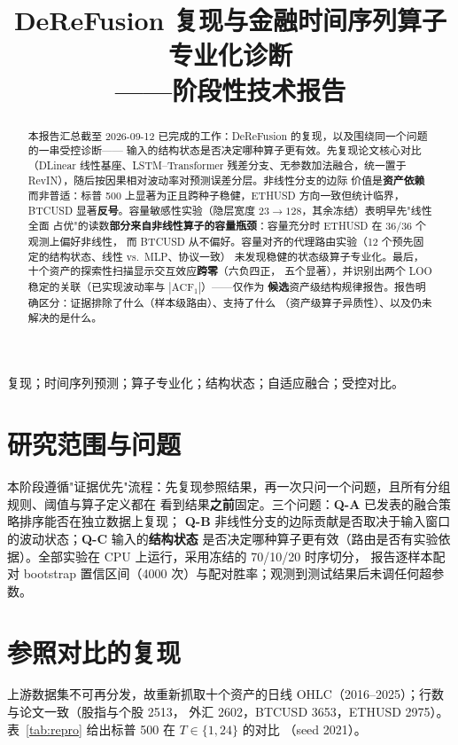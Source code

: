 \documentclass[conference]{IEEEtran}
\begin{document}
\title{DeReFusion 复现与金融时间序列算子专业化诊断\\ \large ——阶段性技术报告}

\author{
}

\maketitle

\begin{abstract}
本报告汇总截至 2026-09-12 已完成的工作：DeReFusion 的复现，以及围绕同一个问题的一串受控诊断——
输入的结构状态是否决定哪种算子更有效。先复现论文核心对比（DLinear 线性基座、LSTM--Transformer
残差分支、无参数加法融合，统一置于 RevIN），随后按因果相对波动率对预测误差分层。非线性分支的边际
价值是\textbf{资产依赖}而非普适：标普 500 上显著为正且跨种子稳健，ETHUSD 方向一致但统计临界，
BTCUSD 显著\textbf{反号}。容量敏感性实验（隐层宽度 $23\!\to\!128$，其余冻结）表明早先"线性全面
占优"的读数\textbf{部分来自非线性算子的容量瓶颈}：容量充分时 ETHUSD 在 $36/36$ 个观测上偏好非线性，
而 BTCUSD 从不偏好。容量对齐的代理路由实验（12 个预先固定的结构状态、线性 vs.\ MLP、协议一致）
未发现稳健的状态级算子专业化。最后，十个资产的探索性扫描显示交互效应\textbf{跨零}（六负四正，
五个显著），并识别出两个 LOO 稳定的关联（已实现波动率与 $|\mathrm{ACF}_1|$）——仅作为
\textbf{候选}资产级结构规律报告。报告明确区分：证据排除了什么（样本级路由）、支持了什么
（资产级算子异质性）、以及仍未解决的是什么。
\end{abstract}

\begin{IEEEkeywords}
复现；时间序列预测；算子专业化；结构状态；自适应融合；受控对比。
\end{IEEEkeywords}

\section{研究范围与问题}
本阶段遵循"证据优先"流程：先复现参照结果，再一次只问一个问题，且所有分组规则、阈值与算子定义都在
看到结果\textbf{之前}固定。三个问题：\textbf{Q-A} 已发表的融合策略排序能否在独立数据上复现；
\textbf{Q-B} 非线性分支的边际贡献是否取决于输入窗口的波动状态；\textbf{Q-C} 输入的\textbf{结构状态}
是否决定哪种算子更有效（路由是否有实验依据）。全部实验在 CPU 上运行，采用冻结的 70/10/20 时序切分，
报告逐样本配对 bootstrap 置信区间（4000 次）与配对胜率；观测到测试结果后未调任何超参数。

\section{参照对比的复现}
上游数据集不可再分发，故重新抓取十个资产的日线 OHLC（2016--2025）；行数与论文一致（股指与个股 2513，
外汇 2602，BTCUSD 3653，ETHUSD 2975）。表~\ref{tab:repro} 给出标普 500 在 $T\in\{1,24\}$ 的对比
（seed 2021）。
\end{document}
